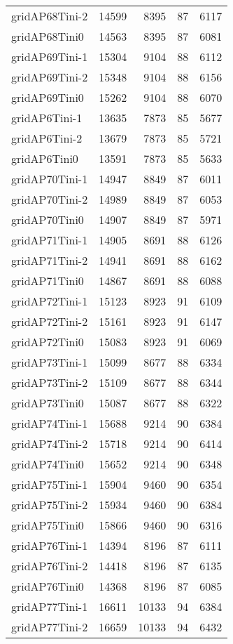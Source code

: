 \documentclass[../../../thesis.tex]{subfiles}
\begin{document}
\begin{longtable}{lrrrr}
gridAP68Tini-2 & 14599 & 8395 & 87 & 6117 \\
gridAP68Tini0 & 14563 & 8395 & 87 & 6081 \\
gridAP69Tini-1 & 15304 & 9104 & 88 & 6112 \\
gridAP69Tini-2 & 15348 & 9104 & 88 & 6156 \\
gridAP69Tini0 & 15262 & 9104 & 88 & 6070 \\
gridAP6Tini-1 & 13635 & 7873 & 85 & 5677 \\
gridAP6Tini-2 & 13679 & 7873 & 85 & 5721 \\
gridAP6Tini0 & 13591 & 7873 & 85 & 5633 \\
gridAP70Tini-1 & 14947 & 8849 & 87 & 6011 \\
gridAP70Tini-2 & 14989 & 8849 & 87 & 6053 \\
gridAP70Tini0 & 14907 & 8849 & 87 & 5971 \\
gridAP71Tini-1 & 14905 & 8691 & 88 & 6126 \\
gridAP71Tini-2 & 14941 & 8691 & 88 & 6162 \\
gridAP71Tini0 & 14867 & 8691 & 88 & 6088 \\
gridAP72Tini-1 & 15123 & 8923 & 91 & 6109 \\
gridAP72Tini-2 & 15161 & 8923 & 91 & 6147 \\
gridAP72Tini0 & 15083 & 8923 & 91 & 6069 \\
gridAP73Tini-1 & 15099 & 8677 & 88 & 6334 \\
gridAP73Tini-2 & 15109 & 8677 & 88 & 6344 \\
gridAP73Tini0 & 15087 & 8677 & 88 & 6322 \\
gridAP74Tini-1 & 15688 & 9214 & 90 & 6384 \\
gridAP74Tini-2 & 15718 & 9214 & 90 & 6414 \\
gridAP74Tini0 & 15652 & 9214 & 90 & 6348 \\
gridAP75Tini-1 & 15904 & 9460 & 90 & 6354 \\
gridAP75Tini-2 & 15934 & 9460 & 90 & 6384 \\
gridAP75Tini0 & 15866 & 9460 & 90 & 6316 \\
gridAP76Tini-1 & 14394 & 8196 & 87 & 6111 \\
gridAP76Tini-2 & 14418 & 8196 & 87 & 6135 \\
gridAP76Tini0 & 14368 & 8196 & 87 & 6085 \\
gridAP77Tini-1 & 16611 & 10133 & 94 & 6384 \\
gridAP77Tini-2 & 16659 & 10133 & 94 & 6432 \\

\end{longtable}
\end{document}
